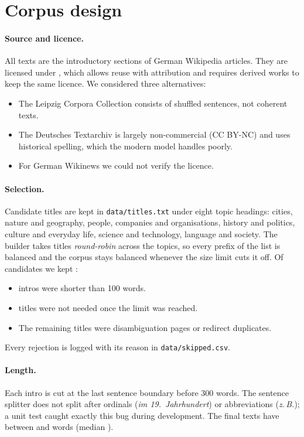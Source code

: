 \documentclass[11pt,a4paper]{article}
\newcommand{\code}[1]{\texttt{#1}}
\newcommand{\de}[1]{\textit{#1}}
\begin{document}
\section{Corpus design}\label{sec:design}

\paragraph{Source and licence.} All texts are the introductory sections of German Wikipedia articles. They are licensed under \Licence{}, which allows reuse with attribution and requires derived works to keep the same licence. We considered three alternatives:
\begin{itemize}
  \item The Leipzig Corpora Collection consists of shuffled sentences, not coherent texts.
  \item The Deutsches Textarchiv is largely non-commercial (CC BY-NC) and uses historical spelling, which the modern model handles poorly.
  \item For German Wikinews we could not verify the licence.
\end{itemize}

\paragraph{Selection.} Candidate titles are kept in \code{data/titles.txt} under eight topic headings: cities, nature and geography, people, companies and organisations, history and politics, culture and everyday life, science and technology, language and society. The builder takes titles \emph{round-robin} across the topics, so every prefix of the list is balanced and the corpus stays balanced whenever the size limit cuts it off. Of \NCandidates{} candidates we kept \NTexts{}:
\begin{itemize}
  \item \NSkippedShort{} intros were shorter than 100 words.
  \item \NSkippedMax{} titles were not needed once the limit was reached.
  \item The remaining titles were disambiguation pages or redirect duplicates.
\end{itemize}
Every rejection is logged with its reason in \code{data/skipped.csv}.

\paragraph{Length.} Each intro is cut at the last sentence boundary before 300 words. The sentence splitter does not split after ordinals (\de{im 19.\ Jahrhundert}) or abbreviations (\de{z.\,B.}); a unit test caught exactly this bug during development. The final texts have between \MinWords{} and \MaxWords{} words (median \MedWords).
\end{document}
